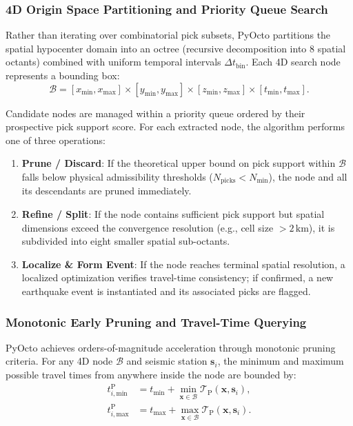 \subsubsection{4D Origin Space Partitioning and Priority Queue Search}
Rather than iterating over combinatorial pick subsets, PyOcto partitions the spatial hypocenter domain into an octree (recursive decomposition into 8 spatial octants) combined with uniform temporal intervals $\Delta t_{\mathrm{bin}}$. Each 4D search node represents a bounding box:
\begin{equation}
  \mathcal{B} = [x_{\mathrm{min}}, x_{\mathrm{max}}] \times [y_{\mathrm{min}}, y_{\mathrm{max}}] \times [z_{\mathrm{min}}, z_{\mathrm{max}}] \times [t_{\mathrm{min}}, t_{\mathrm{max}}].
\end{equation}

Candidate nodes are managed within a priority queue ordered by their prospective pick support score. For each extracted node, the algorithm performs one of three operations:
\begin{enumerate}
  \item \textbf{Prune / Discard}: If the theoretical upper bound on pick support within $\mathcal{B}$ falls below physical admissibility thresholds ($N_{\mathrm{picks}} < N_{\mathrm{min}}$), the node and all its descendants are pruned immediately.
  \item \textbf{Refine / Split}: If the node contains sufficient pick support but spatial dimensions exceed the convergence resolution (e.g., cell size $> 2\,\mathrm{km}$), it is subdivided into eight smaller spatial sub-octants.
  \item \textbf{Localize \& Form Event}: If the node reaches terminal spatial resolution, a localized optimization verifies travel-time consistency; if confirmed, a new earthquake event is instantiated and its associated picks are flagged.
\end{enumerate}

\subsubsection{Monotonic Early Pruning and Travel-Time Querying}
PyOcto achieves orders-of-magnitude acceleration through monotonic pruning criteria. For any 4D node $\mathcal{B}$ and seismic station $\mathbf{s}_i$, the minimum and maximum possible travel times from anywhere inside the node are bounded by:
\begin{align}
  t_{i, \mathrm{min}}^{\mathrm{P}} &= t_{\mathrm{min}} + \min_{\mathbf{x} \in \mathcal{B}} \mathcal{T}_{\mathrm{P}}(\mathbf{x}, \mathbf{s}_i), \\
  t_{i, \mathrm{max}}^{\mathrm{P}} &= t_{\mathrm{max}} + \max_{\mathbf{x} \in \mathcal{B}} \mathcal{T}_{\mathrm{P}}(\mathbf{x}, \mathbf{s}_i).
\end{align}


